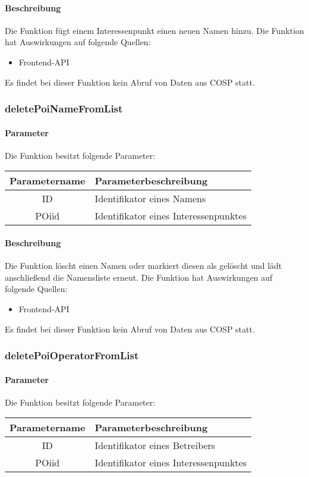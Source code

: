 \paragraph{Beschreibung} Die Funktion fügt einem Interessenpunkt einen neuen Namen hinzu. Die Funktion hat Auswirkungen auf folgende Quellen:
\begin{itemize}
	\item Frontend-API
\end{itemize}
Es findet bei dieser Funktion kein Abruf von Daten aus {\glqq COSP\grqq} statt.
\subsubsection{deletePoiNameFromList}
\paragraph{Parameter} Die Funktion besitzt folgende Parameter:
\begin{table}[H]
	\begin{tabular}{|c|p{11cm}|}
		\hline
		\textbf{Parametername} & \textbf{Parameterbeschreibung} \\ \hline
		ID    & Identifikator eines Namens \\ \hline
		POiid & Identifikator eines Interessenpunktes \\ \hline
	\end{tabular}
\end{table}
\paragraph{Beschreibung} Die Funktion löscht einen Namen oder markiert diesen als gelöscht und lädt anschließend die Namensliste erneut. Die Funktion hat Auswirkungen auf folgende Quellen:
\begin{itemize}
	\item Frontend-API
\end{itemize}
Es findet bei dieser Funktion kein Abruf von Daten aus {\glqq COSP\grqq} statt.
\subsubsection{deletePoiOperatorFromList}
\paragraph{Parameter} Die Funktion besitzt folgende Parameter:
\begin{table}[H]
	\begin{tabular}{|c|p{11cm}|}
		\hline
		\textbf{Parametername} & \textbf{Parameterbeschreibung} \\ \hline
		ID    & Identifikator eines Betreibers \\ \hline
		POiid & Identifikator eines Interessenpunktes \\ \hline
	\end{tabular}
\end{table}
